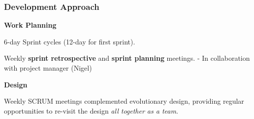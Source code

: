 \documentclass[10pt, compress]{beamer}
\begin{document}
\begin{frame}[fragile]
  \frametitle{Development Approach}
  
  \small {
  
  \vspace{-10pt}
   
   \textbf{Work Planning}
   
   \begin{itemize}
  			\footnotesize{
  			\item 6-day Sprint cycles (12-day for first sprint).
  			\item Weekly \textbf{sprint retrospective} and \textbf{sprint planning} meetings. - In collaboration with project manager (Nigel) 
  			}
  		\end{itemize}
  		
   \textbf{Design}
   
   \begin{itemize}
  			\footnotesize{
  			\item Weekly SCRUM meetings complemented evolutionary design, providing regular opportunities to re-visit the design \textit{all together as a team}.
  			}
  		\end{itemize}
  		  		
  		
%   
  		
}
\end{frame}
\end{document}
